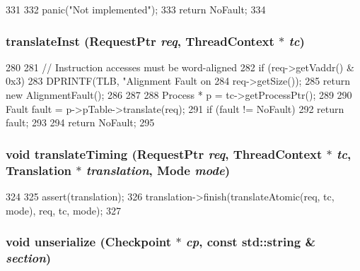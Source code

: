 \begin{DoxyCode}
331 {
332     panic("Not implemented\n");
333     return NoFault;
334 }
\end{DoxyCode}
\hypertarget{classPowerISA_1_1TLB_a072afd8ed455dade4c25a85510e5a4da}{
\subsubsection[{translateInst}]{ translateInst ({\bf RequestPtr} {\em req}, \/  {\bf ThreadContext} $\ast$ {\em tc})}}
\label{classPowerISA_1_1TLB_a072afd8ed455dade4c25a85510e5a4da}



\begin{DoxyCode}
280 {
281     // Instruction accesses must be word-aligned
282     if (req->getVaddr() & 0x3) {
283         DPRINTF(TLB, "Alignment Fault on %
284                 req->getSize());
285         return new AlignmentFault();
286     }
287 
288      Process * p = tc->getProcessPtr();
289 
290      Fault fault = p->pTable->translate(req);
291     if (fault != NoFault)
292         return fault;
293 
294     return NoFault;
295 }
\end{DoxyCode}
\hypertarget{classPowerISA_1_1TLB_ae52f7e465748883695d2b4f432a13652}{
\subsubsection[{translateTiming}]{\setlength{\rightskip}{0pt plus 5cm}void translateTiming ({\bf RequestPtr} {\em req}, \/  {\bf ThreadContext} $\ast$ {\em tc}, \/  {\bf Translation} $\ast$ {\em translation}, \/  {\bf Mode} {\em mode})}}
\label{classPowerISA_1_1TLB_ae52f7e465748883695d2b4f432a13652}



\begin{DoxyCode}
324 {
325     assert(translation);
326     translation->finish(translateAtomic(req, tc, mode), req, tc, mode);
327 }
\end{DoxyCode}
\hypertarget{classPowerISA_1_1TLB_af22e5d6d660b97db37003ac61ac4ee49}{
\subsubsection[{unserialize}]{\setlength{\rightskip}{0pt plus 5cm}void unserialize ({\bf Checkpoint} $\ast$ {\em cp}, \/  const std::string \& {\em section})}}
\label{classPowerISA_1_1TLB_af22e5d6d660b97db37003ac61ac4ee49}



